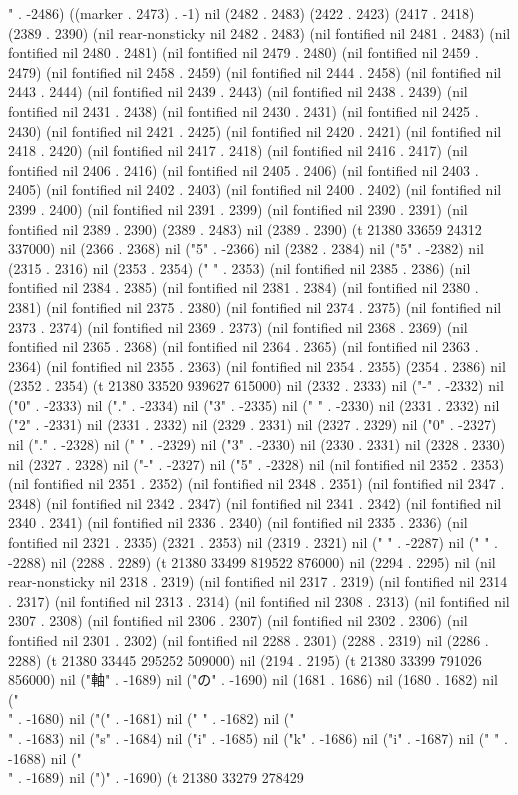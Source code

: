 " . -2486) ((marker . 2473) . -1) nil (2482 . 2483) (2422 . 2423) (2417 . 2418) (2389 . 2390) (nil rear-nonsticky nil 2482 . 2483) (nil fontified nil 2481 . 2483) (nil fontified nil 2480 . 2481) (nil fontified nil 2479 . 2480) (nil fontified nil 2459 . 2479) (nil fontified nil 2458 . 2459) (nil fontified nil 2444 . 2458) (nil fontified nil 2443 . 2444) (nil fontified nil 2439 . 2443) (nil fontified nil 2438 . 2439) (nil fontified nil 2431 . 2438) (nil fontified nil 2430 . 2431) (nil fontified nil 2425 . 2430) (nil fontified nil 2421 . 2425) (nil fontified nil 2420 . 2421) (nil fontified nil 2418 . 2420) (nil fontified nil 2417 . 2418) (nil fontified nil 2416 . 2417) (nil fontified nil 2406 . 2416) (nil fontified nil 2405 . 2406) (nil fontified nil 2403 . 2405) (nil fontified nil 2402 . 2403) (nil fontified nil 2400 . 2402) (nil fontified nil 2399 . 2400) (nil fontified nil 2391 . 2399) (nil fontified nil 2390 . 2391) (nil fontified nil 2389 . 2390) (2389 . 2483) nil (2389 . 2390) (t 21380 33659 24312 337000) nil (2366 . 2368) nil ("5" . -2366) nil (2382 . 2384) nil ("5" . -2382) nil (2315 . 2316) nil (2353 . 2354) ("  " . 2353) (nil fontified nil 2385 . 2386) (nil fontified nil 2384 . 2385) (nil fontified nil 2381 . 2384) (nil fontified nil 2380 . 2381) (nil fontified nil 2375 . 2380) (nil fontified nil 2374 . 2375) (nil fontified nil 2373 . 2374) (nil fontified nil 2369 . 2373) (nil fontified nil 2368 . 2369) (nil fontified nil 2365 . 2368) (nil fontified nil 2364 . 2365) (nil fontified nil 2363 . 2364) (nil fontified nil 2355 . 2363) (nil fontified nil 2354 . 2355) (2354 . 2386) nil (2352 . 2354) (t 21380 33520 939627 615000) nil (2332 . 2333) nil ("-" . -2332) nil ("0" . -2333) nil ("." . -2334) nil ("3" . -2335) nil (" " . -2330) nil (2331 . 2332) nil ("2" . -2331) nil (2331 . 2332) nil (2329 . 2331) nil (2327 . 2329) nil ("0" . -2327) nil ("." . -2328) nil (" " . -2329) nil ("3" . -2330) nil (2330 . 2331) nil (2328 . 2330) nil (2327 . 2328) nil ("-" . -2327) nil ("5" . -2328) nil (nil fontified nil 2352 . 2353) (nil fontified nil 2351 . 2352) (nil fontified nil 2348 . 2351) (nil fontified nil 2347 . 2348) (nil fontified nil 2342 . 2347) (nil fontified nil 2341 . 2342) (nil fontified nil 2340 . 2341) (nil fontified nil 2336 . 2340) (nil fontified nil 2335 . 2336) (nil fontified nil 2321 . 2335) (2321 . 2353) nil (2319 . 2321) nil (" " . -2287) nil (" " . -2288) nil (2288 . 2289) (t 21380 33499 819522 876000) nil (2294 . 2295) nil (nil rear-nonsticky nil 2318 . 2319) (nil fontified nil 2317 . 2319) (nil fontified nil 2314 . 2317) (nil fontified nil 2313 . 2314) (nil fontified nil 2308 . 2313) (nil fontified nil 2307 . 2308) (nil fontified nil 2306 . 2307) (nil fontified nil 2302 . 2306) (nil fontified nil 2301 . 2302) (nil fontified nil 2288 . 2301) (2288 . 2319) nil (2286 . 2288) (t 21380 33445 295252 509000) nil (2194 . 2195) (t 21380 33399 791026 856000) nil ("軸" . -1689) nil ("の" . -1690) nil (1681 . 1686) nil (1680 . 1682) nil ("\\" . -1680) nil ("(" . -1681) nil (" " . -1682) nil ("\\" . -1683) nil ("s" . -1684) nil ("i" . -1685) nil ("k" . -1686) nil ("i" . -1687) nil (" " . -1688) nil ("\\" . -1689) nil (")" . -1690) (t 21380 33279 278429 
